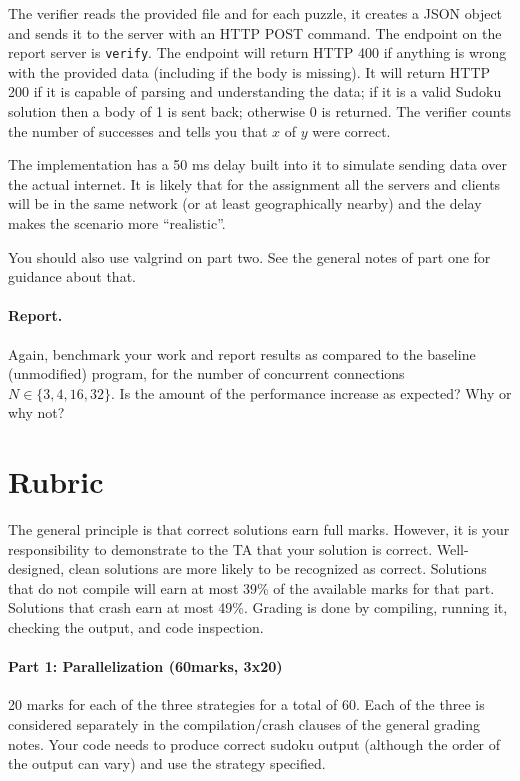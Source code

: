 \documentclass[letterpaper,10pt]{article}
\begin{document}
The verifier reads the provided file and for each puzzle, it 
creates a JSON object and sends it to the server with an HTTP POST command. 
The endpoint on the report server is \texttt{verify}.
The endpoint will return HTTP 400 if anything is wrong with the provided data 
(including if the body is missing). It will return HTTP 200 if it is capable 
of parsing and understanding the data; if it is a valid Sudoku solution 
then a body of 1 is sent back; otherwise 0 is returned. The verifier counts
the number of successes and tells you that $x$ of $y$ were correct.

The implementation has a 50 ms delay built into it to simulate sending data 
over the actual internet. It is likely that for the assignment all the 
servers and clients will be in the same network (or at least geographically
nearby) and the delay makes the scenario more ``realistic''.

You should also use valgrind on part two. See the general notes of part one
for guidance about that.

\paragraph{Report.} Again, benchmark your work and report results as compared to the baseline (unmodified) program, for the number of concurrent connections $N \in \{3, 4, 16, 32\}$. Is the amount of the performance increase as expected? Why or why not?


\section*{Rubric}
The general principle is that correct solutions earn full marks.
However, it is your responsibility to demonstrate to the TA
that your solution is correct. Well-designed, clean solutions 
are more likely to be recognized as correct. 
Solutions that do not compile will earn at most 39\% of the available
marks for that part. Solutions that crash earn
at most 49\%. Grading is done by compiling, running it, checking the 
output, and code inspection. 

\paragraph{Part 1: Parallelization (60marks, 3x20)}
20 marks for each of the three strategies for a total of 60.
Each of the three is considered separately in the compilation/crash 
clauses of the general grading notes.
Your code needs to produce correct sudoku output (although the order of the
output can vary) and use the strategy specified.
\end{document}
